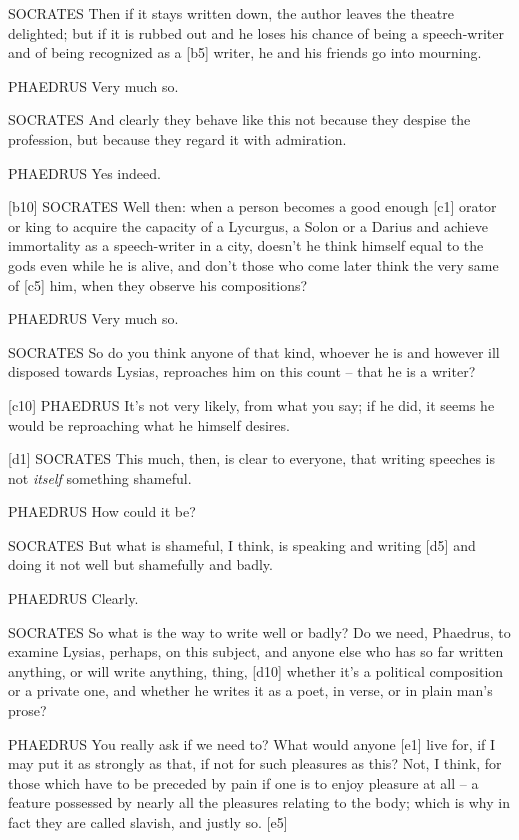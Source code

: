 SOCRATES Then if it stays written down, the
author leaves the
theatre delighted; but if it is rubbed out and he loses his chance of
being a speech-writer and of being recognized as a {[}b5{]} writer, he
and his friends go into mourning.

PHAEDRUS Very much so.

SOCRATES And clearly they behave like this not because they despise the
profession, but because they regard it with admiration.

PHAEDRUS Yes indeed.

{[}b10{]} SOCRATES Well then: when a person becomes a good enough
{[}c1{]} orator or king to acquire the capacity of a Lycurgus, a Solon
or a Darius and achieve
immortality as a speech-writer in a city, doesn't he think himself equal
to the gods even while he is alive, and don't those who come later think
the very same of {[}c5{]} him, when they observe his compositions?

PHAEDRUS Very much so.

SOCRATES So do you think anyone of that kind, whoever he is and however
ill disposed towards Lysias, reproaches him on this count -- that he is
a writer?

{[}c10{]} PHAEDRUS It's not very likely, from what you say; if he did,
it seems he would be reproaching what he himself desires.

{[}d1{]} SOCRATES This much, then, is clear to everyone, that writing
speeches is not {\em itself} something shameful.

PHAEDRUS How could it be?

SOCRATES But what is shameful, I think, is speaking and writing {[}d5{]}
and doing it not well but shamefully and badly.

PHAEDRUS Clearly.

SOCRATES So what is the way to write well or badly? Do we need,
Phaedrus, to examine Lysias, perhaps, on this subject, and anyone else
who has so far written anything, or will write anything, thing,
{[}d10{]} whether it's a political composition or a private one, and
whether he writes it as a poet, in verse, or in plain man's prose?

PHAEDRUS You really ask if we need to? What would anyone {[}e1{]} live
for, if I may put it as strongly as that, if not for such pleasures as
this? Not, I think, for those which have to be preceded by pain if one
is to enjoy pleasure at all -- a feature possessed by nearly all the
pleasures relating to the body; which is why in fact they are called
slavish, and justly so.
{[}e5{]}

